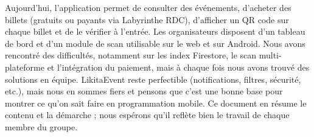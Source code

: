 \documentclass[11pt,a4paper,oneside]{article}
\begin{document}
Aujourd'hui, l'application permet de consulter des événements, d'acheter des billets (gratuits ou payants via Labyrinthe RDC), d'afficher un QR code sur chaque billet et de le vérifier à l'entrée. Les organisateurs disposent d'un tableau de bord et d'un module de scan utilisable sur le web et sur Android. Nous avons rencontré des difficultés, notamment sur les index Firestore, le scan multi-plateforme et l'intégration du paiement, mais à chaque fois nous avons trouvé des solutions en équipe. LikitaEvent reste perfectible (notifications, filtres, sécurité, etc.), mais nous en sommes fiers et pensons que c'est une bonne base pour montrer ce qu'on sait faire en programmation mobile. Ce document en résume le contenu et la démarche ; nous espérons qu'il reflète bien le travail de chaque membre du groupe.
\end{document}

